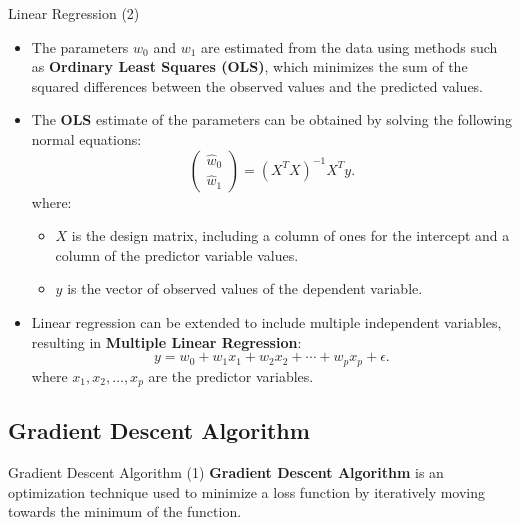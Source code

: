 \documentclass[10pt, hyperref={colorlinks = true,linkcolor = blue}]{beamer}
\begin{document}
{{\begin{frame}{Linear Regression (2) }
\begin{itemize}
  \item The parameters \(w_0\) and \(w_1\) are estimated from the data using methods such as \textbf{Ordinary Least Squares (OLS)}, which minimizes the sum of the squared differences between the observed values and the predicted values.
    \item The \textbf{OLS} estimate of the parameters can be obtained by solving the following normal equations:
    \[
    \begin{pmatrix}
    \hat{w}_0 \\
    \hat{w}_1
    \end{pmatrix}
    =
    \left( X^T X \right)^{-1} X^T y.
    \]
    where:
    \begin{itemize}
        \item \(X\) is the design matrix, including a column of ones for the intercept and a column of the predictor variable values.
        \item \(y\) is the vector of observed values of the dependent variable.
    \end{itemize}
    \item Linear regression can be extended to include multiple independent variables, resulting in \textbf{Multiple Linear Regression}:
    \[
    y = w_0 + w_1 x_1 + w_2 x_2 + \cdots + w_p x_p + \epsilon.
    \]
    where \(x_1, x_2, \ldots, x_p\) are the predictor variables.
\end{itemize}
\end{frame}

}

{\subsection{Gradient Descent Algorithm}

\begin{frame}{Gradient Descent Algorithm (1)}
\textbf{Gradient Descent Algorithm} is an optimization technique used to minimize a loss function by iteratively moving towards the minimum of the function.



\end{frame}}}
\end{document}
